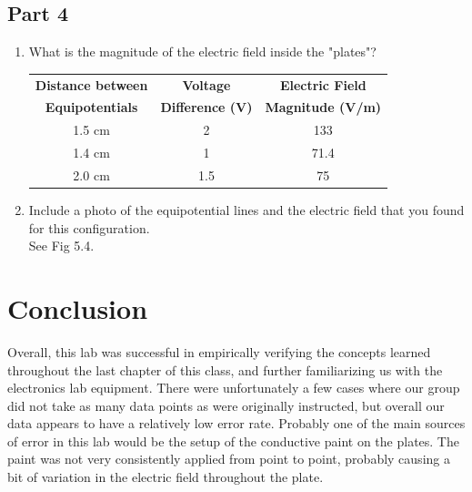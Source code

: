 \documentclass[titlepage]{article}
\begin{document}
		\subsection{Part 4}
		\begin{enumerate}
			\item What is the magnitude of the electric field inside the "plates"?\\
				\FloatBarrier
				\begin{center}
				\begin{table}[hbt!]
			\begin{tabular}{c|c|c}
				\textbf{Distance between} & \textbf{Voltage} & \textbf{Electric Field} \\
				\textbf{Equipotentials} & \textbf{Difference (V)} & \textbf{Magnitude (V/m)}\\
				\hline
				1.5 cm & 2 & 133\\
				1.4 cm & 1 & 71.4    \\
				2.0 cm & 1.5 & 75  \\
			\end{tabular}
			\end{table}
			\end{center}
			\FloatBarrier
			\item Include a photo of the equipotential lines and the electric field that you found for this configuration.\\
			See Fig 5.4.
		\end{enumerate}
	\section{Conclusion}
    Overall, this lab was successful in empirically verifying the concepts learned throughout the last chapter of this class, and further familiarizing us with the electronics lab equipment. There were unfortunately a few cases where our group did not take as many data points as were originally instructed, but overall our data appears to have a relatively low error rate. Probably one of the main sources of error in this lab would be the setup of the conductive paint on the plates. The paint was not very consistently applied from point to point, probably causing a bit of variation in the electric field throughout the plate. 
\end{document}
